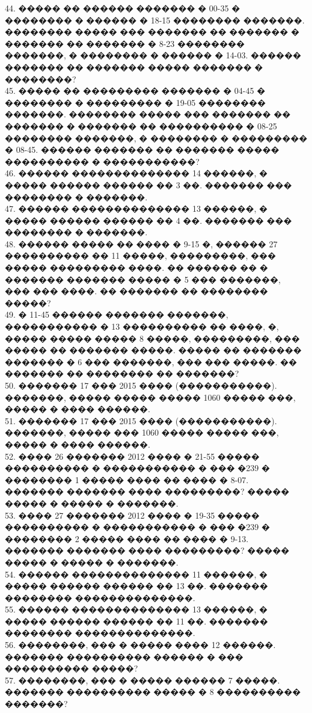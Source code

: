 \documentclass[12pt]{article}
\begin{document}
44. ����� �� ������ ������� � 00-35 � �������� � ������ � 18-15 �������� �������. �������� ����� ��� ������� �� ������� � ������� �� ������� � 8-23 �������� �������, � �������� � ������ � 14-03. ������ ������� �� ������� ����� ������� � ��������?\\
45. ����� �� ��������� ������� � 04-45 � �������� � ��������� � 19-05 �������� �������. �������� ����� ��� ������� �� ������� � ������� �� ���������� � 08-25 �������� �������, � �������� � ��������� � 08-45. ������ ������� �� ������� ����� ���������� � �����������?\\
46. ������ �������������� 14 ������, � ����� ������ ������ �� 3 ��. ������� ��� �������� � �������.\\
47. ������ �������������� 13 ������, � ����� ������ ������ �� 4 ��. ������� ��� �������� � �������.\\
48. ������ ����� �� ���� � 9-15 �, ������ 27 ���������� �� 11 �����, ���������, ��� ����� ��������� ����. �� ������ �� � ������� ������� ����� � 5 ��� �������, ��� ��� ����. �� ������� �� �������� �����?\\
49. � 11-45 ������ ������� �������, ����������� � 13 ���������� �� ����, �, ����� ����� ����� 8 �����, ���������, ��� ����� �� ������� �����. ����� �� ������� ������� � 6 ��� �������, ��� ��� �����. �� ������� �� �������� �� �������?\\
50. ������� 17 ��� 2015 ���� (�����������). �������, ����� ����� ����� 1060 ����� ���, ����� � ���� ������.\\
51. ������� 17 ��� 2015 ���� (�����������). �������, ����� ��� 1060 ����� ����� ���, ����� � ���� ������.\\
52. ���� 26 ������� 2012 ���� � 21-55 ����� ���������� � ����������� � ��� �239 � �������� 1 ����� ���� �� ���� � 8-07. ������� ������� ���� ���������? ����� ����� � ����� � �������.\\
53. ���� 27 ������� 2012 ���� � 19-35 ����� ���������� � ����������� � ��� �239 � �������� 2 ����� ���� �� ���� � 9-13. ������� ������� ���� ���������? ����� ����� � ����� � �������.\\
54. ������ �������������� 11 ������, � ����� ������ ������ �� 13 ��. ������� �������� ��������������.\\
55. ������ �������������� 13 ������, � ����� ������ ������ �� 11 ��. ������� �������� ��������������.\\
56. ��������, ��� � ����� ���� 12 ������. ������� ���������� ������ � ��� ���������� �����?\\
57. ��������, ��� � ����� ������ 7 �����. ������� ���������� ����� � 8 ���������� �������?\\
\end{document}
